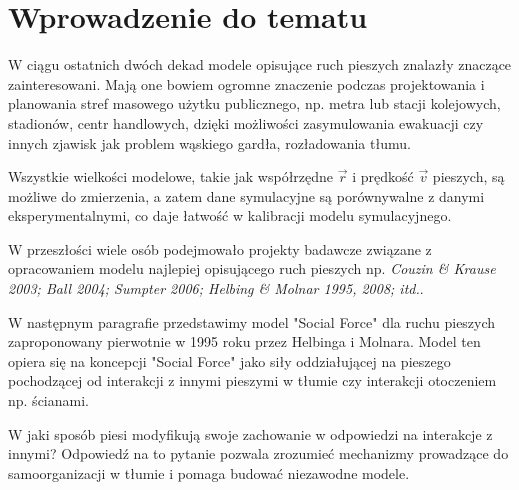 \chapter{Wprowadzenie do tematu}
\hspace{4ex}W ciągu ostatnich dwóch dekad modele opisujące ruch pieszych znalazły znaczące zainteresowani. Mają one bowiem ogromne znaczenie podczas projektowania i planowania stref masowego użytku publicznego, np. metra lub stacji kolejowych, stadionów, centr handlowych, dzięki możliwości zasymulowania ewakuacji czy innych zjawisk jak problem wąskiego gardła, rozładowania tłumu.

Wszystkie wielkości modelowe, takie jak współrzędne $\vec{r}$ i prędkość $\vec{v}$ pieszych, są możliwe do zmierzenia, a zatem dane symulacyjne są porównywalne z danymi eksperymentalnymi, co daje łatwość w kalibracji modelu symulacyjnego. 
\par \medskip
W przeszłości wiele osób podejmowało projekty badawcze związane z opracowaniem modelu najlepiej opisującego ruch pieszych np. 
\textit{Couzin \& Krause 2003; Ball 2004; Sumpter 2006; Helbing \& Molnar 1995, 2008; itd.}. 

W następnym paragrafie przedstawimy model "Social Force" dla ruchu pieszych zaproponowany pierwotnie w 1995 roku przez Helbinga i Molnara. Model ten opiera się na koncepcji "Social Force" jako siły oddziałującej na pieszego pochodzącej od interakcji z innymi pieszymi w tłumie czy interakcji otoczeniem np. ścianami.

W jaki sposób piesi modyfikują swoje zachowanie w odpowiedzi na interakcje z innymi? Odpowiedź na to pytanie pozwala zrozumieć mechanizmy prowadzące do samoorganizacji w tłumie i pomaga budować niezawodne modele.
